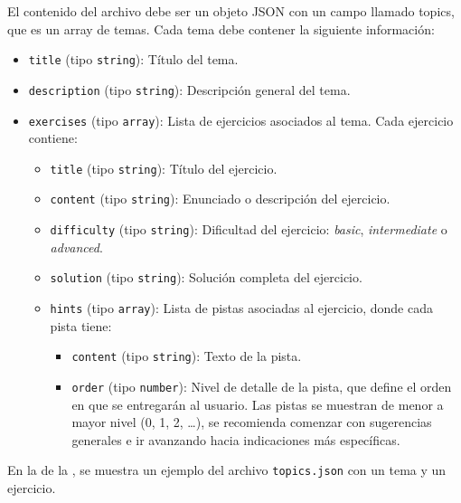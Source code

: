 El contenido del archivo debe ser un objeto JSON con un campo llamado topics, que es un array de temas. Cada tema debe contener la siguiente información:
\begin{itemize}
    \item \texttt{title} (tipo \texttt{string}): Título del tema.
    \item \texttt{description} (tipo \texttt{string}): Descripción general del tema.
    \item \texttt{exercises} (tipo \texttt{array}): Lista de ejercicios asociados al tema. Cada ejercicio contiene:
    \begin{itemize}
        \item \texttt{title} (tipo \texttt{string}): Título del ejercicio.
        \item \texttt{content} (tipo \texttt{string}): Enunciado o descripción del ejercicio.
        \item \texttt{difficulty} (tipo \texttt{string}): Dificultad del ejercicio: \textit{basic}, \textit{intermediate} o \textit{advanced}.
        \item \texttt{solution} (tipo \texttt{string}): Solución completa del ejercicio.
        \item \texttt{hints} (tipo \texttt{array}): Lista de pistas asociadas al ejercicio, donde cada pista tiene:
        \begin{itemize}
            \item \texttt{content} (tipo \texttt{string}): Texto de la pista.
            \item \texttt{order} (tipo \texttt{number}): Nivel de detalle de la pista, que define el orden en que se entregarán al usuario. Las pistas se muestran de menor a mayor nivel (0, 1, 2, \ldots), se recomienda comenzar con sugerencias generales e ir avanzando hacia indicaciones más específicas.
        \end{itemize}
    \end{itemize}
\end{itemize}

En la  de la , se muestra un ejemplo del archivo \texttt{topics.json} con un tema y un ejercicio.

